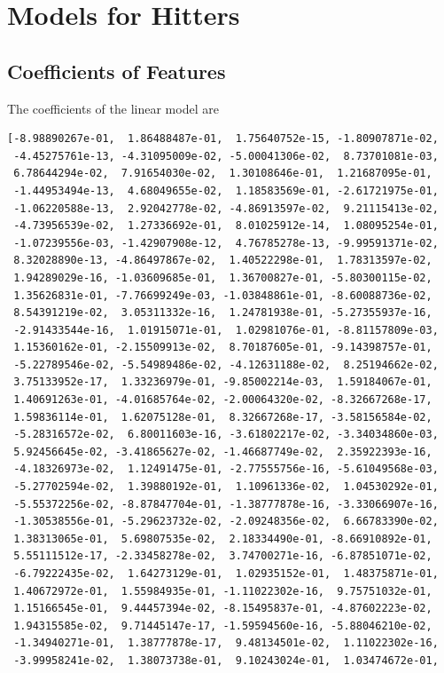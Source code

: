 \documentclass{article}
\begin{document}
\section{Models for Hitters}
\subsection{Coefficients of Features}
The coefficients of the linear model are\\
\begin{verbatim}
[-8.98890267e-01,  1.86488487e-01,  1.75640752e-15, -1.80907871e-02,
 -4.45275761e-13, -4.31095009e-02, -5.00041306e-02,  8.73701081e-03,
 6.78644294e-02,  7.91654030e-02,  1.30108646e-01,  1.21687095e-01,
 -1.44953494e-13,  4.68049655e-02,  1.18583569e-01, -2.61721975e-01,
 -1.06220588e-13,  2.92042778e-02, -4.86913597e-02,  9.21115413e-02,
 -4.73956539e-02,  1.27336692e-01,  8.01025912e-14,  1.08095254e-01,
 -1.07239556e-03, -1.42907908e-12,  4.76785278e-13, -9.99591371e-02,
 8.32028890e-13, -4.86497867e-02,  1.40522298e-01,  1.78313597e-02,
 1.94289029e-16, -1.03609685e-01,  1.36700827e-01, -5.80300115e-02,
 1.35626831e-01, -7.76699249e-03, -1.03848861e-01, -8.60088736e-02,
 8.54391219e-02,  3.05311332e-16,  1.24781938e-01, -5.27355937e-16,
 -2.91433544e-16,  1.01915071e-01,  1.02981076e-01, -8.81157809e-03,
 1.15360162e-01, -2.15509913e-02,  8.70187605e-01, -9.14398757e-01,
 -5.22789546e-02, -5.54989486e-02, -4.12631188e-02,  8.25194662e-02,
 3.75133952e-17,  1.33236979e-01, -9.85002214e-03,  1.59184067e-01,
 1.40691263e-01, -4.01685764e-02, -2.00064320e-02, -8.32667268e-17,
 1.59836114e-01,  1.62075128e-01,  8.32667268e-17, -3.58156584e-02,
 -5.28316572e-02,  6.80011603e-16, -3.61802217e-02, -3.34034860e-03,
 5.92456645e-02, -3.41865627e-02, -1.46687749e-02,  2.35922393e-16,
 -4.18326973e-02,  1.12491475e-01, -2.77555756e-16, -5.61049568e-03,
 -5.27702594e-02,  1.39880192e-01,  1.10961336e-02,  1.04530292e-01,
 -5.55372256e-02, -8.87847704e-01, -1.38777878e-16, -3.33066907e-16,
 -1.30538556e-01, -5.29623732e-02, -2.09248356e-02,  6.66783390e-02,
 1.38313065e-01,  5.69807535e-02,  2.18334490e-01, -8.66910892e-01,
 5.55111512e-17, -2.33458278e-02,  3.74700271e-16, -6.87851071e-02,
 -6.79222435e-02,  1.64273129e-01,  1.02935152e-01,  1.48375871e-01,
 1.40672972e-01,  1.55984935e-01, -1.11022302e-16,  9.75751032e-01,
 1.15166545e-01,  9.44457394e-02, -8.15495837e-01, -4.87602223e-02,
 1.94315585e-02,  9.71445147e-17, -1.59594560e-16, -5.88046210e-02,
 -1.34940271e-01,  1.38777878e-17,  9.48134501e-02,  1.11022302e-16,
 -3.99958241e-02,  1.38073738e-01,  9.10243024e-01,  1.03474672e-01,

\end{verbatim}
\end{document}
